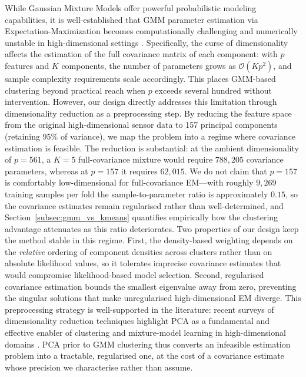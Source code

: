 \documentclass[lettersize,journal]{IEEEtran}
\begin{document}
\noindent While Gaussian Mixture Models offer powerful probabilistic modeling capabilities, it is well-established that GMM parameter estimation via Expectation-Maximization becomes computationally challenging and numerically unstable in high-dimensional settings \cite{jia_feature_2022}. Specifically, the curse of dimensionality affects the estimation of the full covariance matrix of each component: with $p$ features and $K$ components, the number of parameters grows as $\mathcal{O}(K p^2)$, and sample complexity requirements scale accordingly. This places GMM-based clustering beyond practical reach when $p$ exceeds several hundred without intervention. However, our design directly addresses this limitation through dimensionality reduction as a preprocessing step. By reducing the feature space from the original high-dimensional sensor data to 157 principal components (retaining 95\% of variance), we map the problem into a regime where covariance estimation is feasible. The reduction is substantial: at the ambient dimensionality of $p = 561$, a $K = 5$ full-covariance mixture would require $788{,}205$ covariance parameters, whereas at $p = 157$ it requires $62{,}015$. We do not claim that $p = 157$ is comfortably low-dimensional for full-covariance EM---with roughly $9{,}269$ training samples per fold the sample-to-parameter ratio is approximately $0.15$, so the covariance estimates remain regularised rather than well-determined, and Section~\ref{subsec:gmm_vs_kmeans} quantifies empirically how the clustering advantage attenuates as this ratio deteriorates. Two properties of our design keep the method stable in this regime. First, the density-based weighting depends on the \emph{relative} ordering of component densities across clusters rather than on absolute likelihood values, so it tolerates imprecise covariance estimates that would compromise likelihood-based model selection. Second, regularised covariance estimation bounds the smallest eigenvalue away from zero, preventing the singular solutions that make unregularised high-dimensional EM diverge. This preprocessing strategy is well-supported in the literature: recent surveys of dimensionality reduction techniques highlight PCA as a fundamental and effective enabler of clustering and mixture-model learning in high-dimensional domains \cite{berahmand_autoencoders_2024}. PCA prior to GMM clustering thus converts an infeasible estimation problem into a tractable, regularised one, at the cost of a covariance estimate whose precision we characterise rather than assume.
\end{document}
